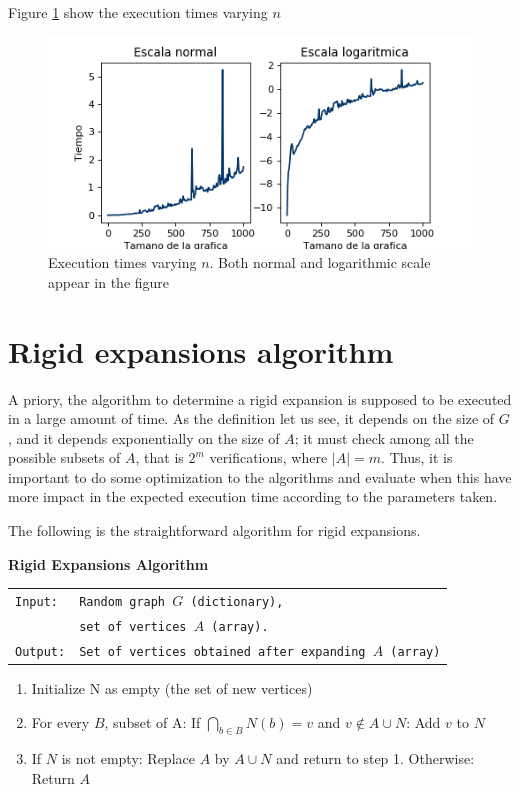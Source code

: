 Figure \ref{fig:tiemposER} show the execution times varying $n$
\begin{figure}[h!]
	\centering
	\includegraphics[scale=0.8]{Python/Figures/Times-ER.png}
	\caption{Execution times varying $n$. Both normal and logarithmic scale appear in the figure}
	\label{fig:tiemposER}
\end{figure}

\section{Rigid expansions algorithm}
A priory, the algorithm to determine a rigid expansion is supposed to be executed in a large amount of time. As the definition let us see, it depends on the size of $ G $, and it depends exponentially on the size of $A$; it must check among all the possible subsets of $A$, that is $2^{m}$ verifications, where $|A|=m$. Thus, it is important to do some optimization to the algorithms and evaluate when this have more impact in the expected execution time according to the parameters taken.

The following is the straightforward algorithm for rigid expansions.

\begin{cajita}
\textbf{Rigid Expansions Algorithm} \hfill \break

\begin{tabular}{ l l }
\texttt{Input:} &  \texttt{Random graph $G$ (dictionary),} \\
                &  \texttt{set of vertices $A$ (array).}\\
\texttt{Output:} & \texttt{Set of vertices obtained after expanding $A$ (array)} \\
\end{tabular}
\begin{enumerate}
\item Initialize N as empty (the set of new vertices)
\item For every $B$, subset of A:\hfill \break
\hphantom{12} If $\bigcap\limits_{b\in B} N(b) = v$ and $v\not\in A\cup N$: \hfill \break
\hphantom{1234} Add $v$ to $N$
\item If $N$ is not empty: \hfill \break
\hphantom{12} Replace $A$ by $A\cup N$ and return to step 1. \hfill \break
      Otherwise:\hfill \break
\hphantom{12} Return $A$
\end{enumerate}
\end{cajita}


